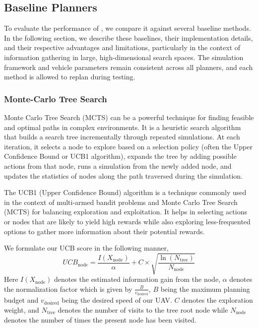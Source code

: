 
\subsection{Baseline Planners}

To evaluate the performance of \PlannerName, we compare it against several baseline methods. In the following section, we describe these baselines, their implementation details, and their respective advantages and limitations, particularly in the context of information gathering in large, high-dimensional search spaces. The simulation framework and vehicle parameters remain consistent across all planners, and each method is allowed to replan during testing.

\subsubsection{Monte-Carlo Tree Search}

Monte Carlo Tree Search (MCTS) can be a powerful technique for finding feasible and optimal paths in complex environments. It is a heuristic search algorithm that builds a search tree incrementally through repeated simulations. At each iteration, it selects a node to explore based on a selection policy (often the Upper Confidence Bound or UCB1 algorithm), expands the tree by adding possible actions from that node, runs a simulation from the newly added node, and updates the statistics of nodes along the path traversed during the simulation. 

The UCB1 (Upper Confidence Bound) algorithm is a technique commonly used in the context of multi-armed bandit problems and Monte Carlo Tree Search (MCTS) for balancing exploration and exploitation. It helps in selecting actions or nodes that are likely to yield high rewards while also exploring less-frequented options to gather more information about their potential rewards. 

We formulate our UCB score in the following manner, \\
\begin{equation*}
    UCB_\text{node} = \frac{I(X_{\text{node}})}{\alpha} + C \times \sqrt{\frac{\ln(N_\text{tree})}{N_\text{node}}}
\end{equation*}
Here $I(X_{\text{node}})$ denotes the estimated information gain from the node, $\alpha$ denotes the normalization factor which is given by $\frac{B}{v_\text{desired}}$, $B$ being the maximum planning budget and $v_\text{desired}$ being the desired speed of our UAV. $C$ denotes the exploration weight, and $N_\text{tree}$ denotes the number of visits to the tree root node while $N_\text{node}$ denotes the number of times the present node has been visited.

